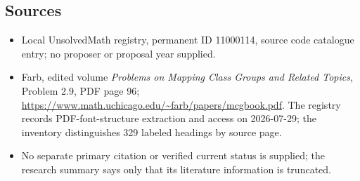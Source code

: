 \documentclass[11pt]{article}
\begin{document}
\subsection{Sources}
\begin{itemize}
\item Local UnsolvedMath registry, permanent ID 11000114, source code catalogue entry; no proposer or proposal year supplied.
\item Farb, edited volume \emph{Problems on Mapping Class Groups and Related Topics}, Problem 2.9, PDF page 96; \url{https://www.math.uchicago.edu/~farb/papers/mcgbook.pdf}. The registry records PDF-font-structure extraction and access on 2026-07-29; the inventory distinguishes 329 labeled headings by source page.
\item No separate primary citation or verified current status is supplied; the research summary says only that its literature information is truncated.
\end{itemize}
\end{document}
